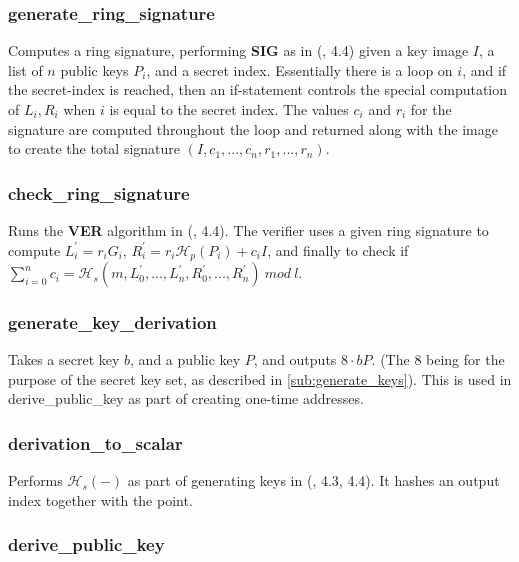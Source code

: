 \documentclass[12pt,english]{mrl}
\numberwithin{equation}{section}
\numberwithin{figure}{section}
\begin{document}
\subsubsection{generate\_ring\_signature}

Computes a ring signature, performing \textbf{SIG} as in (\cite{CN},
4.4) given a key image $I$, a list of $n$ public keys $P_{i}$,
and a secret index. Essentially there is a loop on $i$, and if the
secret-index is reached, then an if-statement controls the special
computation of $L_{i},R_{i}$ when $i$ is equal to the secret index.
The values $c_{i}$ and $r_{i}$ for the signature are computed throughout
the loop and returned along with the image to create the total signature
$\left(I,c_{1},...,c_{n},r_{1},...,r_{n}\right).$ 


\subsubsection{check\_ring\_signature}

Runs the \textbf{VER} algorithm in (\cite{CN}, 4.4). The verifier
uses a given ring signature to compute $L_{i}^{\prime}=r_{i}G_{i}$,
$R_{i}^{\prime}=r_{i}\mathcal{H}_{p}\left(P_{i}\right)+c_{i}I$, and
finally to check if $\sum_{i=0}^{n}c_{i}=\mathcal{H}_{s}\left(m,L_{0}^{\prime},...,L_{n}^{\prime},R_{0}^{\prime},...,R_{n}^{\prime}\right)\ mod\ l$. 


\subsubsection{generate\_key\_derivation}

Takes a secret key $b$, and a public key $P$, and outputs $8\cdot bP$.
(The $8$ being for the purpose of the secret key set, as described
in \ref{sub:generate_keys}). This is used in derive\_public\_key
as part of creating one-time addresses. 


\subsubsection{derivation\_to\_scalar}

Performs $\mathcal{H}_{s}\left(-\right)$ as part of generating keys in
(\cite{CN}, 4.3, 4.4). It hashes an output index together with the
point. 


\subsubsection{derive\_public\_key}
\end{document}

